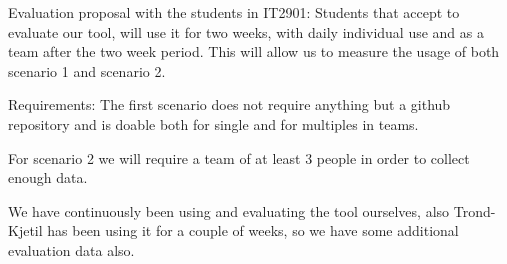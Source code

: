 Evaluation proposal with the students in IT2901: 
Students that accept to evaluate our tool, will use it for two weeks, with daily individual use and as a team after the two week period. This will allow us to measure the
usage of both scenario 1 and scenario 2.

Requirements:
The first scenario does not require anything but a github repository and is doable both for single and for multiples in teams.

For scenario 2 we will require a team of at least 3 people in order to collect enough data. 

We have continuously been using and evaluating the tool ourselves, also Trond-Kjetil has been using it for a couple of weeks, so we have some additional evaluation
data also. 
